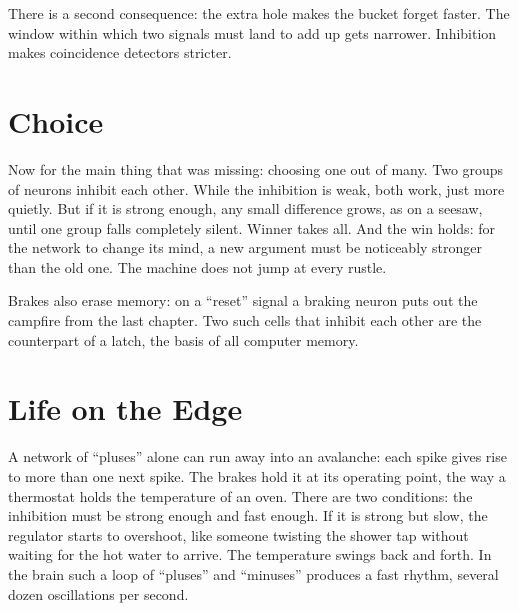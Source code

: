 
There is a second consequence: the extra hole makes the bucket forget faster. The window within which two signals must land to add up gets narrower. Inhibition makes coincidence detectors stricter.

\section*{Choice}

Now for the main thing that was missing: choosing one out of many. Two groups of neurons inhibit each other. While the inhibition is weak, both work, just more quietly. But if it is strong enough, any small difference grows, as on a seesaw, until one group falls completely silent. Winner takes all. And the win holds: for the network to change its mind, a new argument must be noticeably stronger than the old one. The machine does not jump at every rustle.

Brakes also erase memory: on a ``reset'' signal a braking neuron puts out the campfire from the last chapter. Two such cells that inhibit each other are the counterpart of a latch, the basis of all computer memory.

\section*{Life on the Edge}

A network of ``pluses'' alone can run away into an avalanche: each spike gives rise to more than one next spike. The brakes hold it at its operating point, the way a thermostat holds the temperature of an oven. There are two conditions: the inhibition must be strong enough and fast enough. If it is strong but slow, the regulator starts to overshoot, like someone twisting the shower tap without waiting for the hot water to arrive. The temperature swings back and forth. In the brain such a loop of ``pluses'' and ``minuses'' produces a fast rhythm, several dozen oscillations per second.

